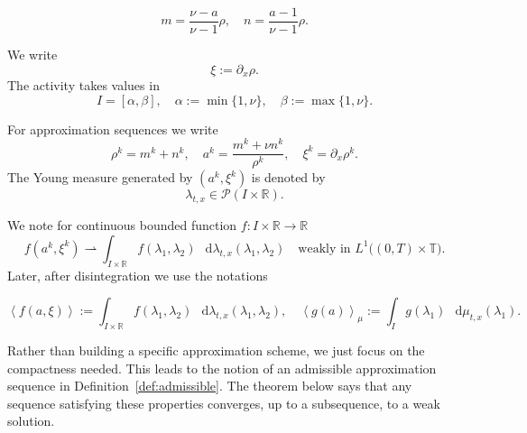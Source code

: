\documentclass[a4paper,twosided,11pt]{article}
\newcommand{\R}{\mathbb{R}}
\newcommand{\T}{\mathbb{T}}
\newcommand{\av}[1]{\left\langle #1 \right\rangle}
\newcommand{\avmu}[1]{\left\langle #1 \right\rangle_{\mu}}
\newcommand{\1}{\mathbf{1}}
\theoremstyle{plain}
\theoremstyle{remark}
\newcommand{\diff}{\mathop{} \mathrm{d}}
\numberwithin{equation}{section}
\begin{document}
\begin{equation}
\label{eq:mnfromrhoa}
 m=\frac{\nu-a}{\nu-1} \rho,  \quad n=\frac{a-1}{\nu-1} \rho.
\end{equation}

We write
$$
\xi:=\partial_x\rho.
$$
The activity takes values in
$$
I=[\alpha,\beta],
\quad \alpha:=\min\{1,\nu\}, \quad \beta:=\max\{1,\nu\}.
$$



For approximation sequences we write
$$
\rho^k=m^k+n^k,
\quad a^k=\frac{m^k+\nu n^k}{\rho^k},
\quad \xi^k=\partial_x\rho^k.
$$
The Young measure generated by $(a^k,\xi^k)$ is denoted by
$$
\lambda_{t,x}\in\mathcal P(I\times\mathbb R).
$$

We note for continuous bounded function $f:I\times\R\to\R$
$$
f(a^k,\xi^k)
\rightharpoonup
\int_{I\times\R} f(\lambda_1,\lambda_2)\,\diff\lambda_{t,x}(\lambda_1,\lambda_2)
\quad \text{weakly in } L^1\bigl((0,T)\times \T\bigr).
$$
Later, after disintegration we use the notations

$$
\av{f(a,\xi)}:=\int_{I\times\R} f(\lambda_1,\lambda_2)\,\diff\lambda_{t,x}(\lambda_1,\lambda_2),
\quad
\avmu{g(a)}:=\int_I g(\lambda_1)\,\diff\mu_{t,x}(\lambda_1).
$$

Rather than building a specific approximation scheme, we just focus on the compactness needed. This leads to the notion of an admissible approximation sequence in Definition~\ref{def:admissible}. The theorem below says that any sequence satisfying these properties converges, up to a subsequence, to a weak solution.
\end{document}
